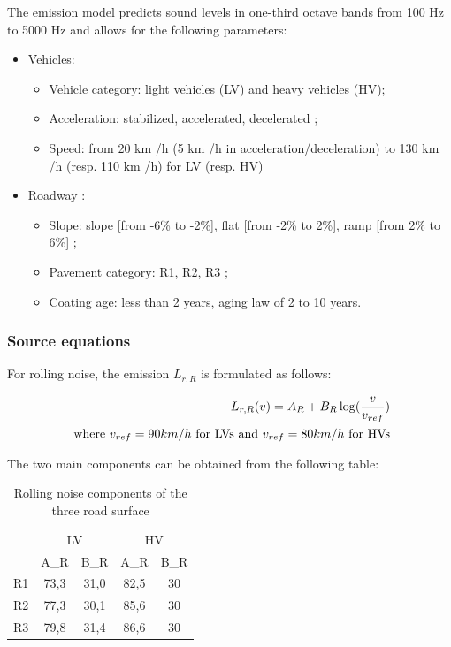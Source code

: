 \documentclass{article}
\begin{document}
\noindent The emission model predicts sound levels in one-third octave bands from 100 Hz to 5000 Hz and allows for the following parameters: 
\begin{itemize}
    \item Vehicles:
    \begin{itemize}
        \item Vehicle category: light vehicles (LV) and heavy vehicles (HV);
        \item Acceleration: stabilized, accelerated, decelerated ;
        \item Speed: from 20 km /h (5 km /h in acceleration/deceleration) to 130 km /h (resp. 110 km /h) for LV (resp. HV)
    \end{itemize}
    \item Roadway :
    \begin{itemize}
        \item Slope: slope [from -6\% to -2\%], flat [from -2\% to 2\%], ramp [from 2\% to 6\%] ;
        \item Pavement category: R1, R2, R3 ;
        \item Coating age: less than 2 years, aging law of 2 to 10 years.
    \end{itemize}
\end{itemize}

\subsubsection{Source equations}

\noindent For rolling noise, the emission $L_{r,R}$ is formulated as follows:

\begin{equation}
    \label{RNC_LV}
    \centering
    \begin{aligned}
        L_{r,R}(v) = A_R+B_R\log(\frac{v}{v_{ref}}) \\
        \text{ where } v_{ref}=90km/h \text{ for LVs and } v_{ref}=80km/h \text{ for HVs}
    \end{aligned}
\end{equation}


\noindent The two main components can be {\color{red} obtained} from the following table:

\begin{table}[H]
\centering
\caption{Rolling noise components of the three road surface}
\label{Rolling noise components of the three road surface}
\begin{tabular}{c|cccc|}
\cline{2-5}
                         & \multicolumn{2}{c}{LV} & \multicolumn{2}{c|}{HV} \\
                         & A_R       & B_R      & A_R       & B_R       \\ \hline
\multicolumn{1}{|c|}{R1} & 73,3       & 31,0      & 82,5       & 30         \\
\multicolumn{1}{|c|}{R2} & 77,3       & 30,1      & 85,6       & 30         \\
\multicolumn{1}{|c|}{R3} & 79,8       & 31,4      & 86,6       & 30         \\ \hline
\end{tabular}
\end{table}
\end{document}
